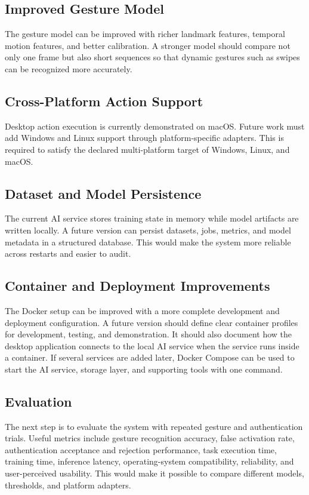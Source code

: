\documentclass[10pt,twocolumn]{article}
\begin{document}
\subsection{Improved Gesture Model}
The gesture model can be improved with richer landmark features, temporal motion features, and better calibration.
A stronger model should compare not only one frame but also short sequences so that dynamic gestures such as swipes can be recognized more accurately.

\subsection{Cross-Platform Action Support}
Desktop action execution is currently demonstrated on macOS.
Future work must add Windows and Linux support through platform-specific adapters.
This is required to satisfy the declared multi-platform target of Windows, Linux, and macOS.

\subsection{Dataset and Model Persistence}
The current AI service stores training state in memory while model artifacts are written locally.
A future version can persist datasets, jobs, metrics, and model metadata in a structured database.
This would make the system more reliable across restarts and easier to audit.

\subsection{Container and Deployment Improvements}
The Docker setup can be improved with a more complete development and deployment configuration.
A future version should define clear container profiles for development, testing, and demonstration.
It should also document how the desktop application connects to the local AI service when the service runs inside a container.
If several services are added later, Docker Compose can be used to start the AI service, storage layer, and supporting tools with one command.

\subsection{Evaluation}
The next step is to evaluate the system with repeated gesture and authentication trials.
Useful metrics include gesture recognition accuracy, false activation rate, authentication acceptance and rejection performance, task execution time, training time, inference latency, operating-system compatibility, reliability, and user-perceived usability.
This would make it possible to compare different models, thresholds, and platform adapters.
\end{document}
